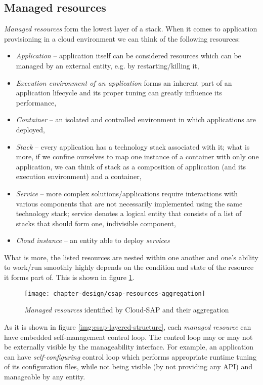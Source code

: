 \subsection{Managed resources}
\emph{Managed resources} form the lowest layer of a stack. When it comes to application provisioning in a cloud environment we can think of the following resources:
\begin{itemize}
  \item \emph{Application} -- application itself can be considered resources which can be managed by an external entity, e.g. by restarting/killing it,
  \item \emph{Execution environment of an application} forms an inherent part of an application lifecycle and its proper tuning can greatly influence its performance,
  \item \emph{Container} -- an isolated and controlled environment in which applications are deployed,
  \item \emph{Stack} -- every application has a technology stack associated with it; what is more, if we confine ourselves to map one instance of a container with only one application, we can think of stack as a composition of application (and its execution environment) and a container,
  \item \emph{Service} -- more complex solutions/applications require interactions with various components that are not necessarily implemented using the same technology stack; service denotes a logical entity that consists of a list of stacks that should form one, indivisible component,
  \item \emph{Cloud instance} -- an entity able to deploy \emph{services}
\end{itemize}
What is more, the listed resources are nested within one another and one's ability to work/run smoothly highly depends on the condition and state of the resource it forms part of. This is shown in figure \ref{img:managed-resources-aggregation}.
\begin{figure}[!ht]
  \begin{center}
    \texttt{[image: chapter-design/csap-resources-aggregation]}
  \end{center}
  \caption{\emph{Managed resources} identified by Cloud-SAP and their aggregation}
  \label{img:managed-resources-aggregation}
\end{figure}

As it is shown in figure \ref{img:csap-layered-structure}, each \emph{managed resource} can have embedded self-management control loop. The control loop may or may not be externally visible by the manageability interface. For example, an application can have \emph{self-configuring} control loop which performs appropriate runtime tuning of its configuration files, while not being visible (by not providing any API) and manageable by any entity.

